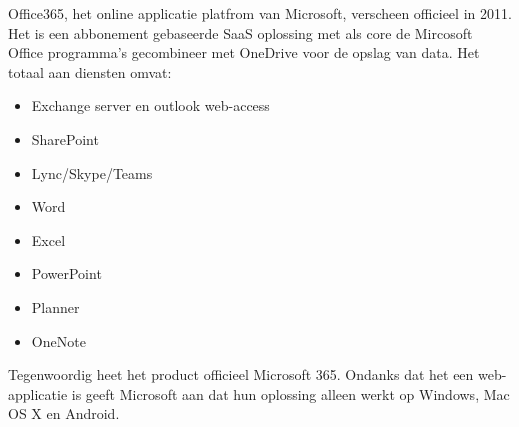 Office365, het online applicatie platfrom van Microsoft, verscheen officieel in 2011. Het is een abbonement gebaseerde SaaS oplossing met als core de Mircosoft Office programma's gecombineer met OneDrive voor de opslag van data. Het totaal aan diensten omvat:
\begin{itemize}
	\item Exchange server en outlook web-access
	\item SharePoint
	\item Lync/Skype/Teams
	\item Word
	\item Excel
	\item PowerPoint
	\item Planner
	\item OneNote
\end{itemize}

Tegenwoordig heet het product officieel Microsoft 365. Ondanks dat het een web-applicatie is geeft Microsoft aan dat hun oplossing alleen werkt op Windows, Mac OS X en Android.
